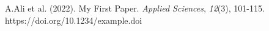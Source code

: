 \documentclass[11pt]{article}
\begin{document}
\noindent
A.Ali et al. (2022). My First Paper. \textit{Applied Sciences}, \textit{12}(3), 101-115. https://doi.org/10.1234/example.doi
\end{document}
